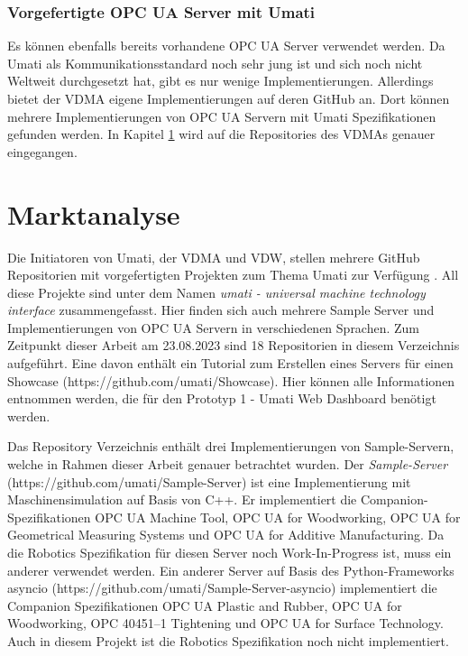 \documentclass[a4paper, 12pt, oneside, toc=listofnumbered, bibliography=totoc]{scrbook}
\begin{document}
			\subsubsection{Vorgefertigte OPC UA Server mit Umati}
			
			Es können ebenfalls bereits vorhandene OPC UA Server verwendet werden. Da Umati als Kommunikationsstandard noch sehr jung ist und sich noch nicht Weltweit durchgesetzt hat, gibt es nur wenige Implementierungen. Allerdings bietet der VDMA eigene Implementierungen auf deren GitHub an. Dort können mehrere Implementierungen von OPC UA Servern mit Umati Spezifikationen gefunden werden. In Kapitel \ref{Marktanalyse} wird auf die Repositories des VDMAs genauer eingegangen.
	
	\section{Marktanalyse}\label{Marktanalyse}
		
		Die Initiatoren von Umati, der \ac{VDMA} und \ac{VDW}, stellen mehrere GitHub Repositorien mit vorgefertigten Projekten zum Thema Umati zur Verfügung \cite{noauthor_github_nodate}. All diese Projekte sind unter dem Namen \textit{umati - universal machine technology interface} zusammengefasst. Hier finden sich auch mehrere Sample Server und Implementierungen von OPC UA Servern in verschiedenen Sprachen. Zum Zeitpunkt dieser Arbeit am 23.08.2023 sind 18 Repositorien in diesem Verzeichnis aufgeführt. Eine davon enthält ein Tutorial zum Erstellen eines Servers für einen Showcase (https://github.com/umati/Showcase). Hier können alle Informationen entnommen werden, die für den Prototyp 1 - Umati Web Dashboard benötigt werden.
		
		Das Repository Verzeichnis enthält drei Implementierungen von Sample-Servern, welche in Rahmen dieser Arbeit genauer betrachtet wurden. Der \textit{Sample-Server} \linebreak (https://github.com/umati/Sample-Server) ist eine Implementierung mit Maschinensimulation auf Basis von C++. Er implementiert die Companion-Spezifikationen OPC UA Machine Tool, OPC UA for Woodworking, OPC UA for Geometrical Measuring Systems und OPC UA for Additive Manufacturing. Da die Robotics Spezifikation für diesen Server noch Work-In-Progress ist, muss ein anderer verwendet werden.
		Ein anderer Server auf Basis des Python-Frameworks asyncio (https://github.com/umati/Sample-Server-asyncio) implementiert die Companion Spezifikationen OPC UA Plastic and Rubber, OPC UA for Woodworking, OPC 40451–1 Tightening und OPC UA for Surface Technology. Auch in diesem Projekt ist die Robotics Spezifikation noch nicht implementiert.
		
\end{document}
